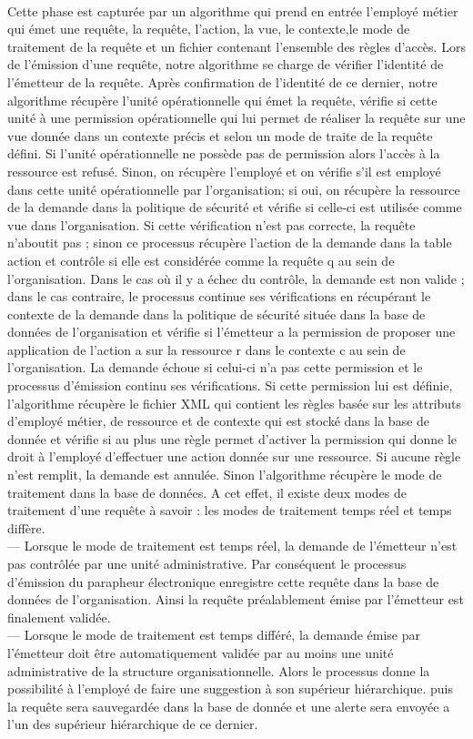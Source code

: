 \paragraph{} Cette phase est capturée par un algorithme qui prend en entrée l'employé métier qui émet une requête, la requête, l'action, la vue, le contexte,le mode de traitement de la requête et un fichier contenant l'ensemble des règles d'accès. Lors de l'émission d'une requête, notre algorithme se charge de vérifier l'identité de l'émetteur de la requête. Après confirmation de l'identité de ce dernier, notre algorithme récupère l'unité opérationnelle qui émet la requête, vérifie si cette unité à une permission opérationnelle qui lui permet de réaliser la requête sur une vue donnée dans un contexte précis et selon un mode de traite de la requête défini. Si l'unité opérationnelle ne possède pas de permission alors l'accès à la ressource est refusé. Sinon, on récupère l'employé et on vérifie s'il est employé dans cette unité opérationnelle par l'organisation; si oui, on récupère la ressource de la demande dans la politique de sécurité et vérifie si celle-ci est utilisée comme vue dans l'organisation. Si cette vérification n'est pas correcte, la requête n'aboutit pas ; sinon ce processus récupère l'action de la demande dans la table action et contrôle si elle est considérée comme la requête q au sein de l'organisation. Dans le cas où il y a échec du contrôle, la demande est non valide ; dans le cas contraire, le processus continue ses vérifications en récupérant le contexte de la demande dans la politique de sécurité située dans la base de données de l'organisation et vérifie si l'émetteur a la permission de proposer une application de l'action a sur la ressource r dans le contexte c au sein de l'organisation. La demande échoue si celui-ci n'a pas cette permission et le processus d'émission continu ses vérifications. Si cette permission
lui est définie, l'algorithme récupère le fichier XML qui contient les règles basée sur les attributs d'employé métier, de ressource et de contexte qui est stocké dans la base de donnée et vérifie si au plus une règle permet d'activer la permission qui donne le droit à l'employé d'effectuer une action donnée sur une ressource. Si aucune règle n'est remplit, la demande est annulée. Sinon l'algorithme récupère le mode de traitement dans la base de données. A cet effet, il existe deux modes de traitement d'une requête à savoir : les modes de traitement temps réel et temps diffère.\\
— Lorsque le mode de traitement est temps réel, la demande de l'émetteur n'est pas contrôlée par une unité administrative. Par conséquent le processus d'émission du parapheur électronique enregistre cette requête dans la base de données de l'organisation. Ainsi la requête préalablement émise par l'émetteur est finalement validée.\\
— Lorsque le mode de traitement est temps différé, la demande émise par l'émetteur doit être automatiquement validée par au moins une unité administrative de la structure organisationnelle. Alors le processus donne la possibilité à l'employé de faire une suggestion à son supérieur hiérarchique. puis la requête sera sauvegardée dans la base de donnée et une alerte sera envoyée a l'un des supérieur hiérarchique de ce dernier.

